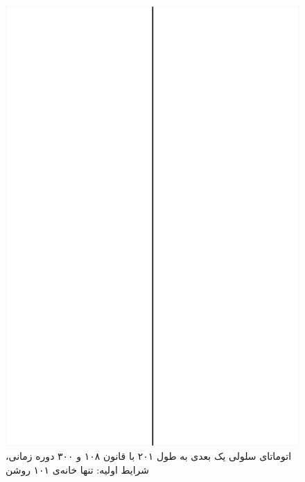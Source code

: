 \documentclass[11pt, a4paper]{article}
\begin{document}
\begin{figure}[!tbp]
\begin{minipage}[b]{0.3\textwidth}
    \includegraphics[width=\textwidth]{q3-108}
    \caption{اتوماتای سلولی یک بعدی به طول ۲۰۱ با قانون ۱۰۸ و ۳۰۰ دوره زمانی، شرایط اولیه: تنها خانه‌ی ۱۰۱ روشن}
    \label{fig:q3-108}
  \end{minipage}
  \hfill
	\begin{minipage}[b]{0.3\textwidth}

\end{minipage}
\end{figure}
\end{document}
